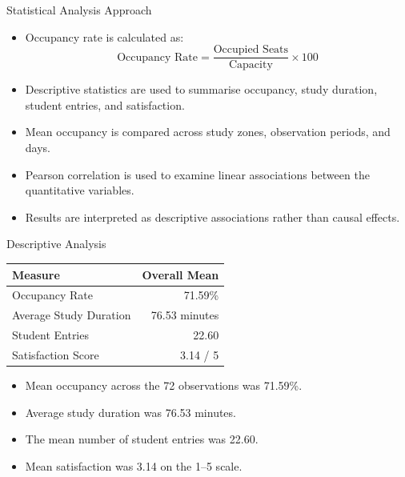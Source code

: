\documentclass[aspectratio=169,11pt]{beamer}
\begin{document}
\begin{frame}{Statistical Analysis Approach}
	\begin{itemize}
		\item Occupancy rate is calculated as:
		\[
		\text{Occupancy Rate} =
		\frac{\text{Occupied Seats}}{\text{Capacity}}\times100
		\]
		
		\item Descriptive statistics are used to summarise occupancy, study duration, student entries, and satisfaction.
		
		\item Mean occupancy is compared across study zones, observation periods, and days.
		
		\item Pearson correlation is used to examine linear associations between the quantitative variables.
		
		\item Results are interpreted as descriptive associations rather than causal effects.
	\end{itemize}
\end{frame}

\begin{frame}{Descriptive Analysis}
	\small
	\begin{table}
		\centering
		\begin{tabular}{lr}
			\toprule
			\textbf{Measure} & \textbf{Overall Mean} \\
			\midrule
			Occupancy Rate & 71.59\% \\
			Average Study Duration & 76.53 minutes \\
			Student Entries & 22.60 \\
			Satisfaction Score & 3.14 / 5 \\
			\bottomrule
		\end{tabular}
	\end{table}
	
	\vspace{0.3cm}
	
	\begin{itemize}
		\item Mean occupancy across the 72 observations was 71.59\%.
		\item Average study duration was 76.53 minutes.
		\item The mean number of student entries was 22.60.
		\item Mean satisfaction was 3.14 on the 1--5 scale.
	\end{itemize}
\end{frame}
\end{document}
